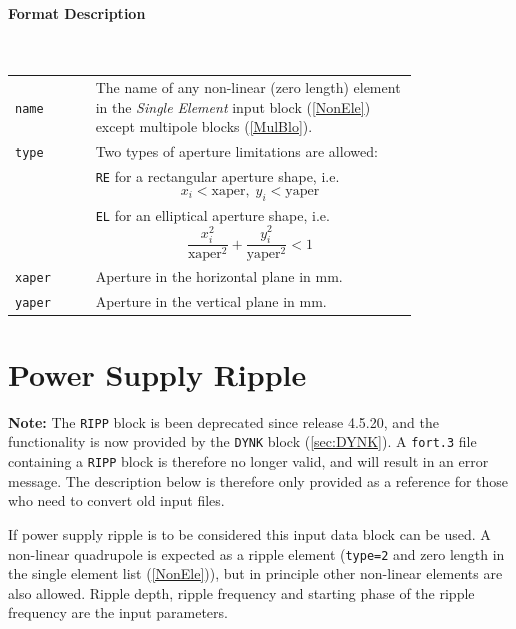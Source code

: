 \paragraph{Format Description}~

\bigskip
\begin{longtabu}{@{}lp{0.8\linewidth}}
    \texttt{name}   & The name of any non-linear (zero length) element in the \textit{Single Element} input block (\ref{NonEle}) except multipole blocks (\ref{MulBlo}). \\
    \texttt{type}   & Two types of aperture limitations are allowed: \\
                    & \texttt{RE} for a rectangular aperture shape, i.e.
                      \begin{equation*}
                          x_{i} < \mathrm{xaper},\; y_{i} < \mathrm{yaper}
                      \end{equation*}\\
                    & \texttt{EL} for an elliptical aperture shape, i.e.
                      \begin{equation*}
                          \frac{x_{i}^{2}}{\mathrm{xaper}^{2}} + \frac{y_{i}^{2}} {\mathrm{yaper}^{2}} < 1
                      \end{equation*}\\
    \texttt{xaper}  & Aperture in the horizontal plane in mm. \\
    \texttt{yaper}  & Aperture in the vertical plane in mm.
\end{longtabu}

\section{Power Supply Ripple} \label{PowRip}

\textcolor{notered}{\textbf{Note:}
The \texttt{RIPP} block is been deprecated since release 4.5.20, and the functionality is now provided by the \texttt{DYNK} block (\ref{sec:DYNK}).
A \texttt{fort.3} file containing a \texttt{RIPP} block is therefore no longer valid, and will result in an error message.
The description below is therefore only provided as a reference for those who need to convert old input files.}

\bigskip
\noindent If power supply ripple is to be considered this input data block can be used. A non-linear quadrupole is expected as a ripple element (\texttt{type=2} and zero length in the single element list (\ref{NonEle})), but in principle other non-linear elements are also allowed.
Ripple depth, ripple frequency and starting phase of the ripple frequency are the input parameters.

